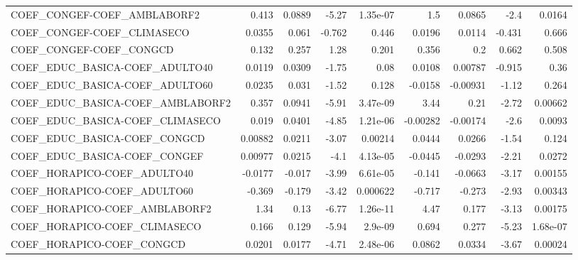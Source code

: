 \begin{tabular}{lrrrrrrrr}
COEF\_CONGEF-COEF\_AMBLABORF2           &       0.413 &       0.0889 &    -5.27 & 1.35e-07 &        1.5 &      0.0865 &         -2.4 &        0.0164 \\
COEF\_CONGEF-COEF\_CLIMASECO            &      0.0355 &        0.061 &   -0.762 &    0.446 &     0.0196 &      0.0114 &       -0.431 &         0.666 \\
COEF\_CONGEF-COEF\_CONGCD               &       0.132 &        0.257 &     1.28 &    0.201 &      0.356 &         0.2 &        0.662 &         0.508 \\
COEF\_EDUC\_BASICA-COEF\_ADULTO40        &      0.0119 &       0.0309 &    -1.75 &     0.08 &     0.0108 &     0.00787 &       -0.915 &          0.36 \\
COEF\_EDUC\_BASICA-COEF\_ADULTO60        &      0.0235 &        0.031 &    -1.52 &    0.128 &    -0.0158 &    -0.00931 &        -1.12 &         0.264 \\
COEF\_EDUC\_BASICA-COEF\_AMBLABORF2      &       0.357 &       0.0941 &    -5.91 & 3.47e-09 &       3.44 &        0.21 &        -2.72 &       0.00662 \\
COEF\_EDUC\_BASICA-COEF\_CLIMASECO       &       0.019 &       0.0401 &    -4.85 & 1.21e-06 &   -0.00282 &    -0.00174 &         -2.6 &        0.0093 \\
COEF\_EDUC\_BASICA-COEF\_CONGCD          &     0.00882 &       0.0211 &    -3.07 &  0.00214 &     0.0444 &      0.0266 &        -1.54 &         0.124 \\
COEF\_EDUC\_BASICA-COEF\_CONGEF          &     0.00977 &       0.0215 &     -4.1 & 4.13e-05 &    -0.0445 &     -0.0293 &        -2.21 &        0.0272 \\
COEF\_HORAPICO-COEF\_ADULTO40           &     -0.0177 &       -0.017 &    -3.99 & 6.61e-05 &     -0.141 &     -0.0663 &        -3.17 &       0.00155 \\
COEF\_HORAPICO-COEF\_ADULTO60           &      -0.369 &       -0.179 &    -3.42 & 0.000622 &     -0.717 &      -0.273 &        -2.93 &       0.00343 \\
COEF\_HORAPICO-COEF\_AMBLABORF2         &        1.34 &         0.13 &    -6.77 & 1.26e-11 &       4.47 &       0.177 &        -3.13 &       0.00175 \\
COEF\_HORAPICO-COEF\_CLIMASECO          &       0.166 &        0.129 &    -5.94 &  2.9e-09 &      0.694 &       0.277 &        -5.23 &      1.68e-07 \\
COEF\_HORAPICO-COEF\_CONGCD             &      0.0201 &       0.0177 &    -4.71 & 2.48e-06 &     0.0862 &      0.0334 &        -3.67 &       0.00024 \\

\end{tabular}
